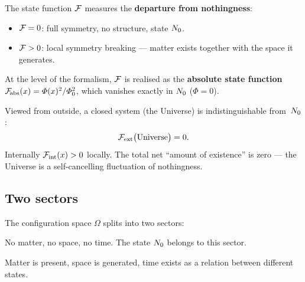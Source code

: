 \begin{definition}\label{def:F}
The state function $\mathcal{F}$ measures the \textbf{departure from
nothingness}:
\begin{itemize}[nosep]
  \item $\mathcal{F} = 0$: full symmetry, no structure, state $N_0$.
  \item $\mathcal{F} > 0$: local symmetry breaking --- matter exists
        together with the space it generates.
\end{itemize}
At the level of the formalism, $\mathcal{F}$ is realised as the
\textbf{absolute state function}
$\mathcal{F}_{\!\mathrm{abs}}(x) = \varPhi(x)^2/\varPhi_0^2$,
which vanishes exactly in $N_0$ ($\Phi = 0$).
\end{definition}

\begin{axiom}\label{ax:zero}
Viewed from outside, a closed system (the Universe) is
indistinguishable from~$N_0$:
\begin{equation}\label{eq:zero-sum}
    \mathcal{F}_{\mathrm{ext}}\bigl(\text{Universe}\bigr) = 0.
\end{equation}
Internally $\mathcal{F}_{\mathrm{int}}(x) > 0$ locally.  The total net
``amount of existence'' is zero --- the Universe is a self-cancelling
fluctuation of nothingness.
\end{axiom}

\subsection{Two sectors}\label{ssec:sektory}

\begin{definition}\label{def:sektory}
The configuration space $\Omega$ splits into two sectors:
\begin{description}[style=nextline,nosep]
  \item[{$\mathcal{S}_0 = \{\sigma : \Ffield[\sigma] = 0\}$
    --- nothingness sector}]
    No matter, no space, no time.
    The state $N_0$ belongs to this sector.
  \item[{$\mathcal{S}_1 = \{\sigma : \Ffield[\sigma] > 0\}$
    --- existence sector}]
    Matter is present, space is generated, time exists as a
    relation between different states.
\end{description}
\end{definition}


